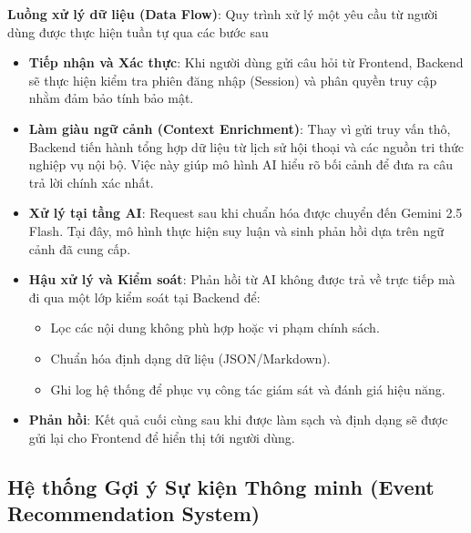 \indent \indent \textbf{Luồng xử lý dữ liệu (Data Flow)}: Quy trình xử lý một yêu cầu từ người dùng được thực hiện tuần tự qua các bước sau
\begin{itemize}
    \item[1.] \textbf{Tiếp nhận và Xác thực}: Khi người dùng gửi câu hỏi từ Frontend, Backend sẽ thực hiện kiểm tra phiên đăng nhập (Session) và phân quyền truy cập nhằm đảm bảo tính bảo mật.
    \item[2.] \textbf{Làm giàu ngữ cảnh (Context Enrichment)}: Thay vì gửi truy vấn thô, Backend tiến hành tổng hợp dữ liệu từ lịch sử hội thoại và các nguồn tri thức nghiệp vụ nội bộ. Việc này giúp mô hình AI hiểu rõ bối cảnh để đưa ra câu trả lời chính xác nhất.
    \item[3.] \textbf{Xử lý tại tầng AI}: Request sau khi chuẩn hóa được chuyển đến Gemini 2.5 Flash. Tại đây, mô hình thực hiện suy luận và sinh phản hồi dựa trên ngữ cảnh đã cung cấp.
    \item[4.] \textbf{Hậu xử lý và Kiểm soát}: Phản hồi từ AI không được trả về trực tiếp mà đi qua một lớp kiểm soát tại Backend để:
    \begin{itemize}
        \item[-] Lọc các nội dung không phù hợp hoặc vi phạm chính sách.
        \item[-] Chuẩn hóa định dạng dữ liệu (JSON/Markdown).
        \item[-] Ghi log hệ thống để phục vụ công tác giám sát và đánh giá hiệu năng.
    \end{itemize}
    \item[5.] \textbf{Phản hồi}: Kết quả cuối cùng sau khi được làm sạch và định dạng sẽ được gửi lại cho Frontend để hiển thị tới người dùng.
\end{itemize}

\subsection{Hệ thống Gợi ý Sự kiện Thông minh (Event Recommendation System)}

